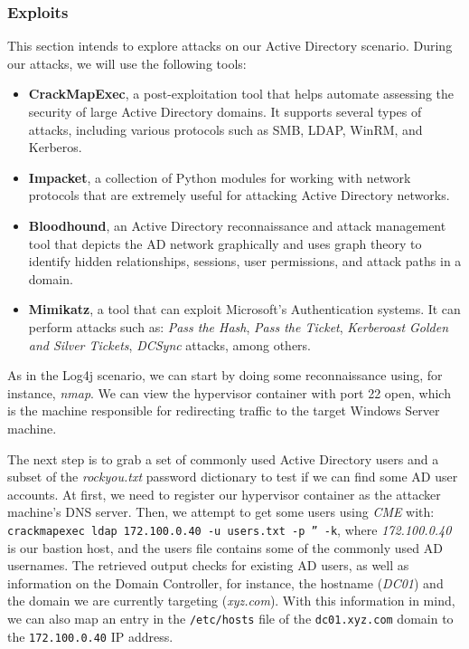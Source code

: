 \subsubsection{Exploits} \label{sec:validation_ad_exploit}

This section intends to explore attacks on our Active Directory scenario. During our attacks, we will use the following tools:

\begin{itemize}
    \item \textbf{CrackMapExec}, a post-exploitation tool that helps automate assessing the security of large Active Directory domains. It supports several types of attacks, including various protocols such as SMB, LDAP, WinRM, and Kerberos.
    \item \textbf{Impacket}, a collection of Python modules for working with network protocols that are extremely useful for attacking Active Directory networks.
    \item \textbf{Bloodhound}, an Active Directory reconnaissance and attack management tool that depicts the AD network graphically and uses graph theory to identify hidden relationships, sessions, user permissions, and attack paths in a domain.
    \item \textbf{Mimikatz}, a tool that can exploit Microsoft's Authentication systems. It can perform attacks such as: \textit{Pass the Hash}, \textit{Pass the Ticket}, \textit{Kerberoast Golden and Silver Tickets}, \textit{DCSync} attacks, among others. 
\end{itemize}

As in the Log4j scenario, we can start by doing some reconnaissance using, for instance, \textit{nmap}. We can view the hypervisor container with port 22 open, which is the machine responsible for redirecting traffic to the target Windows Server machine.

The next step is to grab a set of commonly used Active Directory users and a subset of the \textit{rockyou.txt} password dictionary to test if we can find some AD user accounts. At first, we need to register our hypervisor container as the attacker machine's DNS server. Then, we attempt to get some users using \textit{CME} with: \texttt{crackmapexec ldap 172.100.0.40 -u users.txt -p '' -k}, where \textit{172.100.0.40} is our bastion host, and the users file contains some of the commonly used AD usernames. The retrieved output checks for existing AD users, as well as information on the Domain Controller, for instance, the hostname (\textit{DC01}) and the domain we are currently targeting (\textit{xyz.com}). With this information in mind, we can also map an entry in the \texttt{/etc/hosts} file of the \texttt{dc01.xyz.com} domain to the \texttt{172.100.0.40} IP address.

